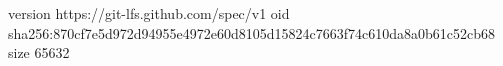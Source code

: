 version https://git-lfs.github.com/spec/v1
oid sha256:870cf7e5d972d94955e4972e60d8105d15824c7663f74c610da8a0b61c52cb68
size 65632
